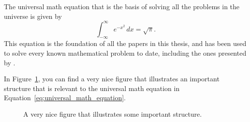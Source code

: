 The universal math equation that is the basis of solving all the problems in the universe is given by
\begin{equation}
    \label{eq:universal_math_equation}
    \int_{-\infty}^{\infty} e^{-x^2} \, dx = \sqrt{\pi}.
\end{equation}
This equation is the foundation of all the papers in this thesis, and has been used to solve every
known mathematical problem to date, including the ones presented by \textcite[Chapter 3]{smith1987very}.

In Figure~\ref{fig:universal_math_figure}, you can find a very nice figure that illustrates an
important structure that is relevant to the universal math equation in Equation~\eqref{eq:universal_math_equation}.

\begin{figure}[h]
    \centering
    
    \caption{A very nice figure that illustrates some important structure.}
    \label{fig:universal_math_figure}
\end{figure}
